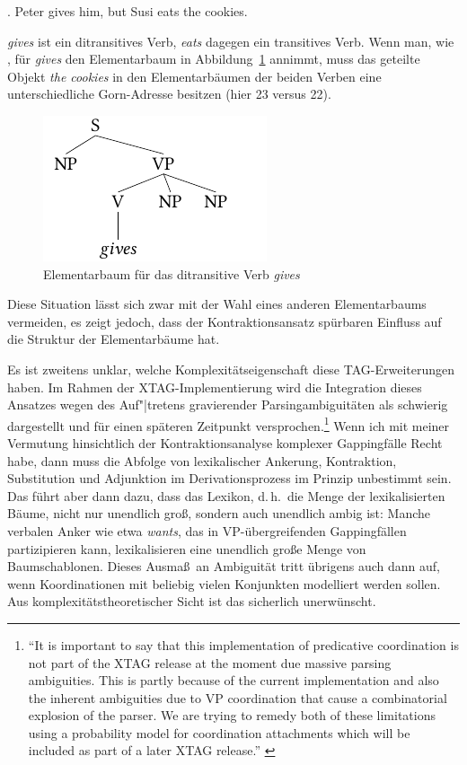 \ex. \label{ex-contraction-4} Peter gives him, but Susi eats the cookies.

{\it gives} ist ein ditransitives Verb, {\it eats} dagegen ein transitives Verb. Wenn man, wie \citet[Abbildung~20]{Sarkar:Joshi:97}, für {\it gives} den Elementarbaum in Abbildung~\ref{fig-contraction-5} annimmt, muss das geteilte Objekt {\it the cookies} in den Elementarbäumen der beiden Verben eine unterschiedliche Gorn-Adresse besitzen (hier 23 versus 22).
\begin{figure}[t]
\centering
\includegraphics{graphics/abb810.pdf}
\caption{\label{fig-contraction-5}Elementarbaum für das ditransitive Verb {\it gives}}
\end{figure}
Diese Situation lässt sich zwar mit der Wahl eines anderen Elementarbaums vermeiden, es zeigt jedoch, dass der Kontraktionsansatz spürbaren Einfluss auf die Struktur der Elementarbäume hat. %

\newpage
Es ist zweitens unklar, welche Komplexitätseigenschaft diese TAG-Erweiter\-ungen haben. Im Rahmen der XTAG-Implementierung \citep{xtag:01} wird die Integration dieses Ansatzes wegen des Auf"|tretens gravierender Parsingambiguitäten als schwierig dargestellt und für einen späteren Zeitpunkt versprochen.\footnote{"`It is important to say that this implementation of predicative coordination is not part of the XTAG release at the moment due massive parsing ambiguities. This is partly because of the current implementation and also the inherent ambiguities due to VP coordination that cause a combinatorial explosion of the parser. We are trying to remedy both of these limitations using a probability model for coordination attachments which will be included as part of a later XTAG release."' \citep[224]{xtag:01}} Wenn ich mit meiner Vermutung hinsichtlich der Kontraktionsanalyse komplexer Gappingfälle Recht habe, dann muss die Abfolge von lexikalischer Ankerung, Kontraktion, Substitution und Adjunktion im Derivationsprozess im Prinzip unbestimmt sein. Das führt aber dann dazu, dass das Lexikon, d.\,h.\ die Menge der lexikalisierten Bäume, nicht nur unendlich gro\ss, sondern auch unendlich ambig ist: Manche verbalen Anker wie etwa {\it wants}, das in VP-übergreifenden Gappingfällen partizipieren kann, lexikalisieren eine unendlich gro\ss e Menge von Baumschablonen. Dieses Ausma\ss\ an Ambiguität tritt übrigens auch dann auf, wenn Koordinationen mit beliebig vielen Konjunkten modelliert werden sollen. Aus komplexitätstheoretischer Sicht ist das sicherlich unerwünscht.    


